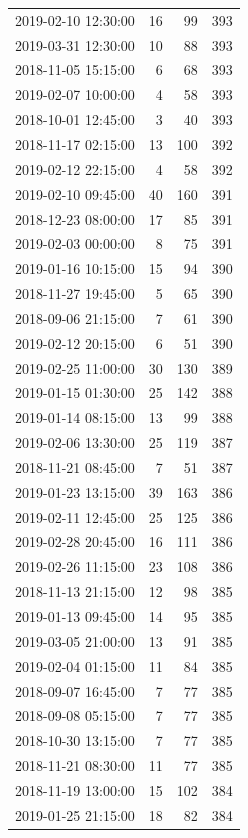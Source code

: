 \begin{tabular}{lrrr}
2019-02-10 12:30:00 & 16 & 99 & 393 \\
2019-03-31 12:30:00 & 10 & 88 & 393 \\
2018-11-05 15:15:00 & 6 & 68 & 393 \\
2019-02-07 10:00:00 & 4 & 58 & 393 \\
2018-10-01 12:45:00 & 3 & 40 & 393 \\
2018-11-17 02:15:00 & 13 & 100 & 392 \\
2019-02-12 22:15:00 & 4 & 58 & 392 \\
2019-02-10 09:45:00 & 40 & 160 & 391 \\
2018-12-23 08:00:00 & 17 & 85 & 391 \\
2019-02-03 00:00:00 & 8 & 75 & 391 \\
2019-01-16 10:15:00 & 15 & 94 & 390 \\
2018-11-27 19:45:00 & 5 & 65 & 390 \\
2018-09-06 21:15:00 & 7 & 61 & 390 \\
2019-02-12 20:15:00 & 6 & 51 & 390 \\
2019-02-25 11:00:00 & 30 & 130 & 389 \\
2019-01-15 01:30:00 & 25 & 142 & 388 \\
2019-01-14 08:15:00 & 13 & 99 & 388 \\
2019-02-06 13:30:00 & 25 & 119 & 387 \\
2018-11-21 08:45:00 & 7 & 51 & 387 \\
2019-01-23 13:15:00 & 39 & 163 & 386 \\
2019-02-11 12:45:00 & 25 & 125 & 386 \\
2019-02-28 20:45:00 & 16 & 111 & 386 \\
2019-02-26 11:15:00 & 23 & 108 & 386 \\
2018-11-13 21:15:00 & 12 & 98 & 385 \\
2019-01-13 09:45:00 & 14 & 95 & 385 \\
2019-03-05 21:00:00 & 13 & 91 & 385 \\
2019-02-04 01:15:00 & 11 & 84 & 385 \\
2018-09-07 16:45:00 & 7 & 77 & 385 \\
2018-09-08 05:15:00 & 7 & 77 & 385 \\
2018-10-30 13:15:00 & 7 & 77 & 385 \\
2018-11-21 08:30:00 & 11 & 77 & 385 \\
2018-11-19 13:00:00 & 15 & 102 & 384 \\
2019-01-25 21:15:00 & 18 & 82 & 384 \\

\end{tabular}
